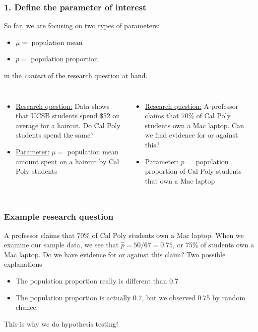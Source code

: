 \begin{frame}
\frametitle{1. Define the parameter of interest}
So far, we are focusing on two types of parameters:
\begin{itemize}
    \item
    $\mu =$ population mean
    \item
    $p =$ population proportion
\end{itemize}
in the \emph{context} of the research question at hand.\\
\vskip10pt
\begin{columns}
\begin{itemize}
\item
\underline{Research question:}
Data shows that UCSB students spend \$52 on average for a haircut.  Do Cal Poly students spend the same?
\item
\underline{Parameter:} $\mu=$ population mean amount spent on a haircut by Cal Poly students
\end{itemize}
\begin{itemize}
\item
\underline{Research question:}
A professor claims that 70\% of Cal Poly students own a Mac laptop.  Can we find evidence for or against this?
\item
\underline{Parameter:} $p=$ population proportion of Cal Poly students that own a Mac laptop
\end{itemize}
\end{columns}
\end{frame}

\begin{frame}
\frametitle{Example research question}
A professor claims that 70\% of Cal Poly students own a Mac laptop.  When we examine our sample data, we see that $\hat{p}=50/67=0.75$, or 75\% of students own a Mac laptop.  Do we have evidence for or against this claim?
\vskip10pt
Two possible explanations
    \begin{itemize}
        \item
        The population proportion really is different than 0.7
        \item
        The population proportion is actually 0.7, but we observed 0.75 by random chance.
\end{itemize}
\vskip10pt
This is why we do hypothesis testing!
\end{frame}

